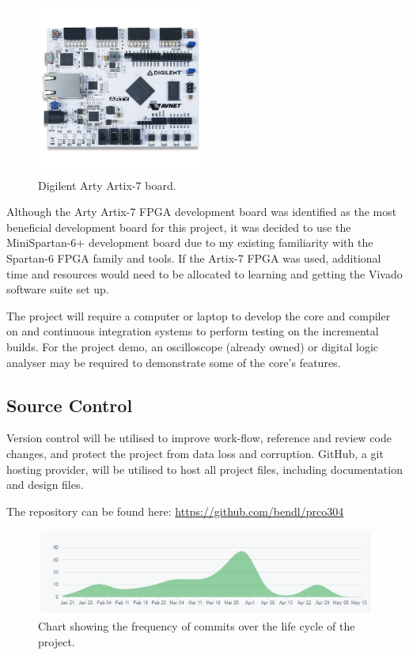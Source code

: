\documentclass[11pt,a4paper]{report}
\begin{document}
\begin{enumerate}
{\begin{figure}[H]
\centering
     \includegraphics[width=0.5\textwidth]{arty}
      \caption{Digilent Arty Artix-7 board.}
       \label{fig:res:arty}
\end{figure}
}
\end{enumerate}

Although the Arty Artix-7 FPGA development board was identified as the most beneficial development board for this project, it was decided to use the MiniSpartan-6+ development board due to my existing familiarity with the Spartan-6 FPGA family and tools. If the Artix-7 FPGA was used, additional time and resources would need to be allocated to learning and getting the Vivado software suite set up.

The project will require a computer or laptop to develop the core and compiler on and continuous integration systems to perform testing on the incremental builds. For the project demo, an oscilloscope (already owned) or digital logic analyser may be required to demonstrate some of the core's features.

\subsection{Source Control}
Version control will be utilised to improve work-flow, reference and review code changes, and protect the project from data loss and corruption. GitHub, a git hosting provider, will be utilised to host all project files, including documentation and design files.

The repository can be found here: \href{https://github.com/bendl/prco304}{https://github.com/bendl/prco304}

\begin{figure}[H]
\centering
\includegraphics[scale=0.7]{github}
\caption{Chart showing the frequency of commits over the life cycle of the project.}
\end{figure}
\end{document}
